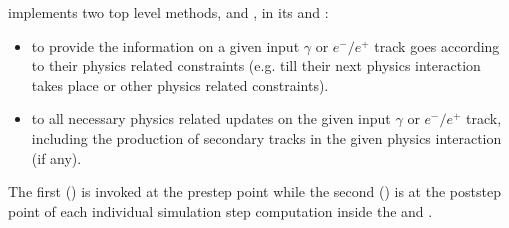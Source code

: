 \documentclass[letterpaper,10pt,english]{sphinxmanual}
\begin{document}
\begin{fulllineitems}
\sphinxAtStartPar
{} implements two top level methods,  and , in its  and :\begin{itemize}
\item {} 
\sphinxAtStartPar
to provide the information on  a given input \(\gamma\) or \(e^-/e^+\) track goes according to their physics related constraints (e.g. till their next physics interaction takes place or other physics related constraints).

\item {} 
\sphinxAtStartPar
to  all necessary physics related updates on the given input \(\gamma\) or \(e^-/e^+\) track, including the production of secondary tracks in the given physics interaction (if any).

\end{itemize}


\sphinxAtStartPar
The first () is invoked at the pre\sphinxhyphen{}step point while the second () is at the post\sphinxhyphen{}step point of each individual simulation step computation inside the  and . 

\end{fulllineitems}

\end{document}
